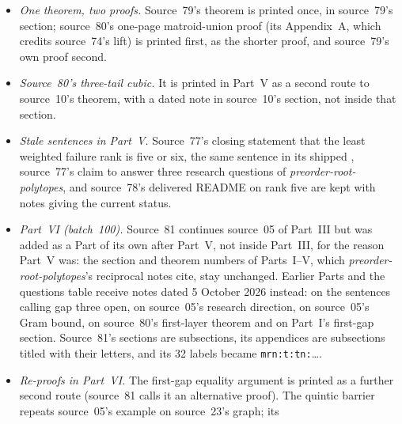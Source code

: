 \documentclass[11pt,a4paper]{article}
\theoremstyle{remark}\newtheorem{remark}[theorem]{Remark}
\newcommand{\prp}{\emph{preorder-root-polytopes}}
\begin{document}
\begin{itemize}
  are kept with notes. Proofs are replaced by pointers where they are the
  repository's proofs (source~77's ambient theorem, leaf compression and thin
  covers; source~80's derivation of the quota count and its higher-rank limit
  argument), and printed as marked second routes where they differ: source~77's
  path and Gram-determinant proof of $2+2$ real-rootedness, its rooted-path proof
  of the $1+2$ lemma (used by the rank-three minimum) and its rank-five
  certificate; source~78's 26 certificates; source~79's proofs of its graph
  corollaries; source~80's proof of the three-tail cubic. Source~80's scalar
  counterexample displays and its two numerical instances are kept, with the
  attribution to Part~XI of \prp{} that source~80 omits.
\item \emph{One theorem, two proofs.} Source~79's theorem is printed once, in
  source~79's section; source~80's one-page matroid-union proof (its
  Appendix~A, which credits source~74's lift) is printed first, as the shorter
  proof, and source~79's own proof second.
\item \emph{Source~80's three-tail cubic.} It is printed in Part~V as a second
  route to source~10's theorem, with a dated note in source~10's section, not
  inside that section.
\item \emph{Stale sentences in Part~V.} Source~77's closing statement that the
  least weighted failure rank is five or six, the same sentence in its shipped
  , source~77's claim to answer three research
  questions of \prp, and source~78's delivered README on rank five are kept
  with notes giving the current status.
\item \emph{Part~VI (batch~100).} Source~81 continues source~05 of Part~III but
  was added as a Part of its own after Part~V, not inside Part~III, for the
  reason Part~V was: the section and theorem numbers of Parts~I--V, which
  \prp's reciprocal notes cite, stay unchanged. Earlier Parts and the
  questions table receive notes dated 5 October 2026 instead: on the
  sentences calling gap three open, on source~05's research direction, on
  source~05's Gram bound, on source~80's first-layer theorem and on Part~I's
  first-gap section. Source~81's sections are subsections, its appendices are
  subsections titled with their letters, and its 32 labels became
  \texttt{mrn:t:tn:}\dots.
\item \emph{Re-proofs in Part~VI.} The first-gap equality argument is printed
  as a further second route (source~81 calls it an alternative proof). The
  quintic barrier repeats source~05's example on source~23's graph; its

\end{itemize}
\end{document}
